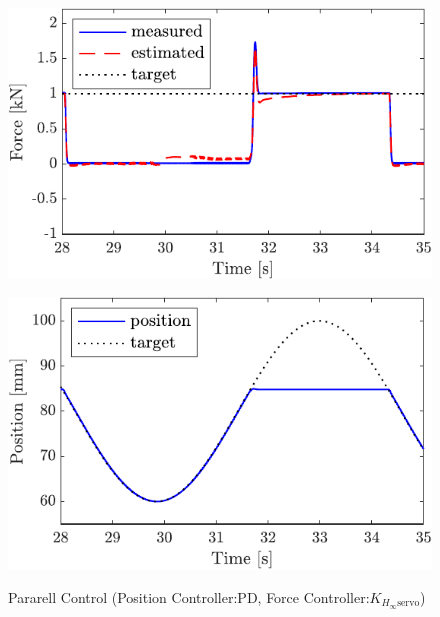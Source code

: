 \begin{figure}[t]
    \begin{minipage}{\minipageratio\hsize}
    \centering
        \includegraphics[keepaspectratio, scale = \minifigscale]{contents/IntegrationControl/figure/SECASQ/crop-FBsw_JFPS4_force.pdf}
        \label{fig5:crop-FBsw_JFPS4_force}
    \end{minipage}
    \begin{minipage}{\minipageratio\hsize}
    \centering
        \includegraphics[keepaspectratio, scale = \minifigscale]
        {contents/IntegrationControl/figure/SECASQ/crop-FBsw_JFPS4_pos.pdf}
        \label{fig5:crop-FBsw_JFPS4_pos}
    \end{minipage}
    \caption{Pararell Control (Position Controller:PD, Force Controller:$K_{H_\infty\mathrm{servo}}$)}   
    \label{fig5:crop-FBsw_JFPS4}
\end{figure}

